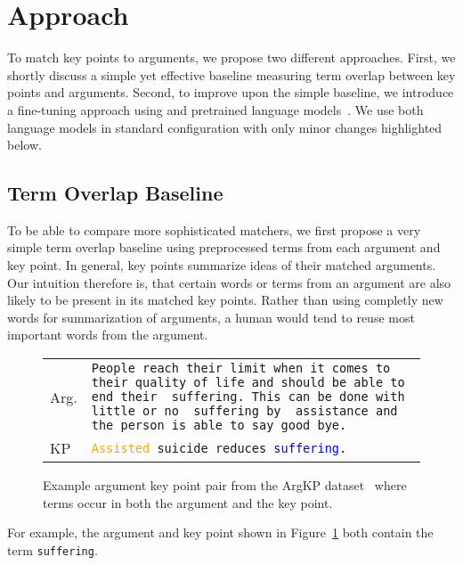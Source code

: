\section{Approach}\label{approach}

To match key points to arguments, we propose two different approaches.
First, we shortly discuss a simple yet effective baseline measuring term overlap between key points and arguments.
Second, to improve upon the simple baseline, we introduce a fine-tuning approach using \Bert and \Roberta pretrained language models~\cite{DevlinCLT2019,LiuOGDJCLLZS2019}. We use both language models in standard configuration with only minor changes highlighted below.

\subsection{Term Overlap Baseline}
To be able to compare more sophisticated matchers, we first propose a very simple term overlap baseline using preprocessed terms from each argument and key point. 
In general, key points summarize ideas of their matched arguments.
Our intuition therefore is, that certain words or terms from an argument are also likely to be present in its matched key points.
Rather than using completly new words for summarization of arguments, a human would tend to reuse most important words from the argument.
\begin{figure}
    \begin{tabularx}{\linewidth}{@{}lX@{}}
        Arg. & \texttt{People reach their limit when it comes to their quality of life and should be able to end their {\color{blue} suffering}. This can be done with little or no {\color{blue} suffering} by {\color{orange} assistance} and the person is able to say good bye.} \\
        KP & \texttt{\textcolor{orange}{Assisted} suicide reduces \textcolor{blue}{suffering}.}
    \end{tabularx}
    \caption{Example argument key point pair from the ArgKP dataset~\cite{Bar-HaimEFKLS2020} where terms occur in both the argument and the key point.}
    \label{example-overlap}
\end{figure}
For example, the argument and key point shown in Figure~\ref{example-overlap} both contain the term \texttt{suffering}.

